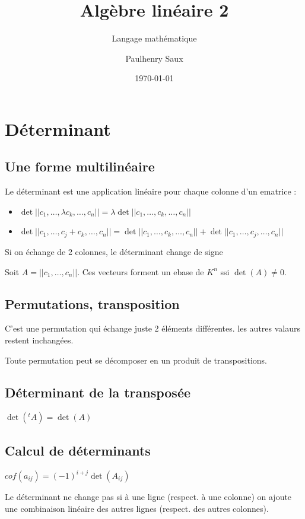 \documentclass[french]{yLectureNote}
\title{Algèbre linéaire 2}
\subtitle{Langage mathématique}
\author{Paulhenry Saux}
\date{\today}
\begin{document}
\chapter{Déterminant}
\section{Une forme multilinéaire}
\begin{theorem}
Le déterminant est une application linéaire pour chaque colonne d'un ematrice :
\begin{itemize}
 \item \(\det||c_1, \dots, \lambda c_k, \dots, c_n|| = \lambda \det||c_1, \dots, c_k, \dots, c_n||\)
 \item \(\det||c_1, \dots, c_j + c_k, \dots, c_n|| =  \det||c_1, \dots, c_k, \dots, c_n|| + \det||c_1, \dots, c_j, \dots, c_n||\)
\end{itemize}
\end{theorem}
\begin{proposition}
Si on échange de 2 colonnes, le déterminant change de signe
\end{proposition}
\begin{theorem}
 Soit \(A = ||c_1, \dots, c_n||\). Ces vecteurs forment un ebase de $K^n$ ssi \(\det(A)\neq 0\).
\end{theorem}
\section{Permutations, transposition}
\begin{definition}[Transposiiton]
C'est une permutation qui échange juste 2 éléments différentes. les autres valaurs restent inchangées.
\end{definition}
\begin{proposition}
Toute permutation peut se décomposer en un produit de transpositions.
\end{proposition}
\section{Déterminant de la transposée}
\begin{theorem}
 \(\det(^tA) = \det(A)\)
\end{theorem}
\section{Calcul de déterminants}
\begin{definition}[Cofacteur]
\(cof(a_{ij}) = (-1)^{i+j}\det(A_{ij})\)
\end{definition}
\begin{proposition}
Le déterminant ne change pas si à une ligne (respect. à une
colonne) on ajoute une combinaison linéaire des autres lignes (respect. des autres
colonnes).
\end{proposition}
\end{document}
